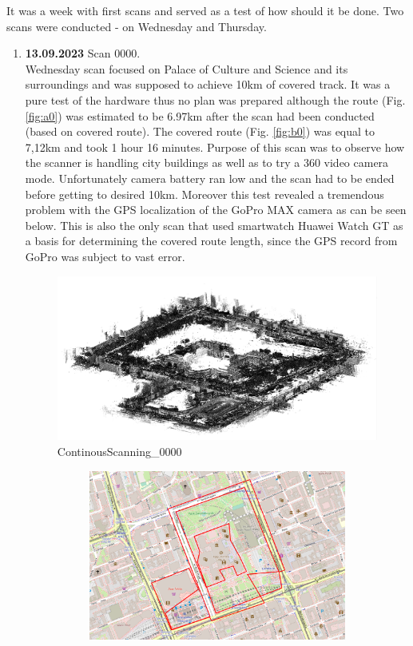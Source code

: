 \documentclass[a4paper,12pt]{book}
\begin{document}
It was a week with first scans and served as a test of how should it be done. Two scans were conducted - on Wednesday and Thursday.
\begin{enumerate}
	\item \textbf{13.09.2023} Scan 0000. \\
	 Wednesday scan focused on Palace of Culture and Science and its surroundings and was supposed to achieve 10km of covered track. It was a pure test of the hardware thus no plan was prepared although the route (Fig. \ref{fig:a0}) was estimated to be 6.97km after the scan had been conducted (based on covered route). The covered route (Fig. \ref{fig:b0}) was equal to 7,12km and took 1 hour 16 minutes. Purpose of this scan was to observe how the scanner is handling city buildings as well as to try a 360 video camera mode. Unfortunately camera battery ran low and the scan had to be ended before getting to desired 10km. Moreover this test revealed a tremendous problem with the GPS localization of the GoPro MAX camera as can be seen below. This is also the only scan that used smartwatch Huawei Watch GT as a basis for determining the covered route length, since the GPS record from GoPro was subject to vast error.
	 \begin{figure}[H]
 		\includegraphics[width=1\linewidth]{cloud0}
	 	\caption{ContinousScanning\_0000}
	 \end{figure}
	\begin{figure}[H]
		\centering
		\begin{subfigure}{.90\textwidth}
			\centering
			\includegraphics[width=1\linewidth]{route_p0}

\end{subfigure}
\end{figure}
\end{enumerate}
\end{document}

